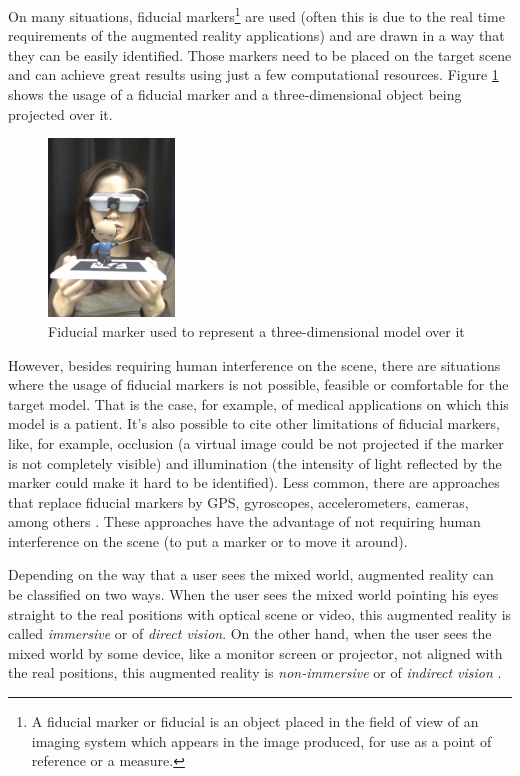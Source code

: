 \documentclass[msc, a4paper, classic, en]{ufbathesis}
\begin{document}
On many situations, fiducial markers\footnote{A fiducial marker or fiducial is an object placed in the field of view of an imaging system which appears in the image produced, for use as a point of reference or a measure.} are used (often this is due to the real time requirements of the augmented reality applications) \cite{azuma} and are drawn in a way that they can be easily identified. Those markers need to be placed on the target scene and can achieve great results using just a few computational resources. Figure \ref{fig:fiducial_marker} shows the usage of a fiducial marker and a three-dimensional object being projected over it.

\begin{figure}
\centering
\includegraphics[width=0.3\textwidth]{images/fiducial_marker.png}
\caption{Fiducial marker used to represent a three-dimensional model over it \cite{artoolkit}}
\label{fig:fiducial_marker}
\end{figure}

However, besides requiring human interference on the scene, there are situations where the usage of fiducial markers is not possible, feasible or comfortable for the target model. That is the case, for example, of medical applications on which this model is a patient. It's also possible to cite other limitations of fiducial markers, like, for example, occlusion (a virtual image could be not projected if the marker is not completely visible) and illumination (the intensity of light reflected by the marker could make it hard to be identified). Less common, there are approaches that replace fiducial markers \cite{carmigniani} \cite{gallo09} by GPS, gyroscopes, accelerometers, cameras, among others \cite{azuma} \cite{azuma01}. These approaches have the advantage of not requiring human interference on the scene (to put a marker or to move it around).

Depending on the way that a user sees the mixed world, augmented reality can be classified on two ways. When the user sees the mixed world pointing his eyes straight to the real positions with optical scene or video, this augmented reality is called \textit{immersive} or of \textit{direct vision}. On the other hand, when the user sees the mixed world by some device, like a monitor screen or projector, not aligned with the real positions, this augmented reality is \textit{non-immersive} or of \textit{indirect vision} \cite{tori2006fundamentos}.
\end{document}
